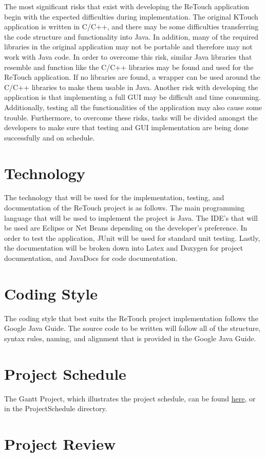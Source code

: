\documentclass{article}
\begin{document}
    The most significant risks that exist with developing the ReTouch application begin with the expected difficulties during implementation. The original KTouch application is written in C/C++, and there may be some difficulties transferring the code structure and functionality into Java. In addition, many of the required libraries in the original application may not be portable and therefore may not work with Java code. In order to overcome this risk, similar Java libraries that resemble and function like the C/C++ libraries may be found and used for the ReTouch application. If no libraries are found, a wrapper can be used around the C/C++ libraries to make them usable in Java. Another risk with developing the application is that implementing a full GUI may be difficult and time consuming. Additionally, testing all the functionalities of the application may also cause some trouble. Furthermore, to overcome these risks, tasks will be divided amongst the developers to make sure that testing and GUI implementation are being done successfully and on schedule.


\section{Technology}

    The technology that will be used for the implementation, testing, and documentation of the ReTouch project is as follows. The main programming language that will be used to implement the project is Java. The IDE's that will be used are Eclipse or Net Beans depending on the developer's preference. In order to test the application, JUnit will be used for standard unit testing. Lastly, the documentation will be broken down into Latex and Doxygen for project documentation, and JavaDocs for code documentation.

\section{Coding Style}

    The coding style that best suits the ReTouch project implementation follows the Google Java Guide. The source code to be written will follow all of the structure, syntax rules, naming, and alignment that is provided in the Google Java Guide. 

\section{Project Schedule}

The Gantt Project, which illustrates the project schedule, can be found 
\href{run:../../ProjectSchedule/Gantt_Project_Revision_0.gan}{here}, or in the ProjectSchedule directory. 


\section{Project Review}
\end{document}
